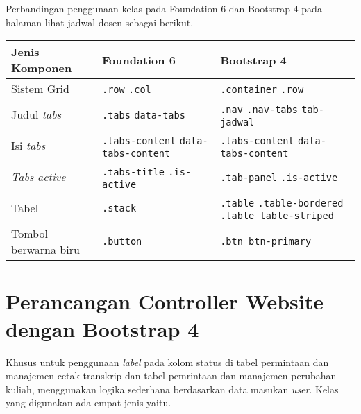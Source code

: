 \noindent Perbandingan penggunaan kelas pada Foundation 6 dan Bootstrap 4 pada halaman lihat jadwal dosen sebagai berikut.\\

\begin{tabular}{| p{} | p{} | p{} |} 
	\hline
	\textbf{Jenis Komponen} & \textbf{Foundation 6} & \textbf{Bootstrap 4}  \\ [0.5ex] 
	\hline	
	Sistem Grid & \newline \texttt{.row} \newline \texttt{.col} &   \texttt{.container} \newline \texttt{.row} \\ 
	\hline	
	Judul \textit{tabs} & \texttt{.tabs} \newline \texttt{data-tabs} &  \texttt{.nav} \newline \texttt{.nav-tabs} \newline \texttt{tab-jadwal} \\
	\hline
	Isi \textit{tabs} & \texttt{.tabs-content} \newline \texttt{data-tabs-content} &  \texttt{.tabs-content} \newline \texttt{data-tabs-content} \\
	\hline
	\textit{Tabs active} & \texttt{.tabs-title} \newline \texttt{.is-active} & \texttt{.tab-panel} \newline \texttt{.is-active} \\
	\hline	
	Tabel & \texttt{.stack} & \texttt{.table} \newline \texttt{.table-bordered} \newline \texttt{.table table-striped}  \\
	\hline
	Tombol berwarna biru & \texttt{.button} & \texttt{.btn btn-primary}\\ [1ex]
	\hline
\end{tabular}



\section{Perancangan Controller Website dengan Bootstrap 4}
Khusus untuk penggunaan \textit{label} pada kolom status di tabel permintaan dan manajemen cetak transkrip dan tabel pemrintaan dan manajemen perubahan kuliah, menggunakan logika sederhana berdasarkan data masukan \textit{user}. Kelas yang digunakan ada empat jenis yaitu.\\

